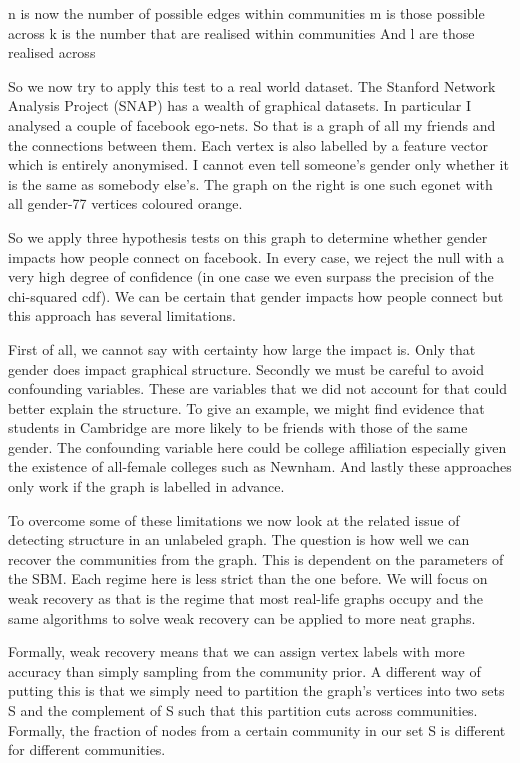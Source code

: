 \documentclass[]{article}
\begin{document}
n is now the number of possible edges within communities
m is those possible across
k is the number that are realised within communities
And l are those realised across

So we now try to apply this test to a real world dataset. The Stanford Network Analysis Project (SNAP) has a wealth of graphical datasets. In particular I analysed a couple of facebook ego-nets. So that is a graph of all my friends and the connections between them. Each vertex is also labelled by a feature vector which is entirely anonymised. I cannot even tell someone’s gender only whether it is the same as somebody else’s. The graph on the right is one such egonet with all gender-77 vertices coloured orange.

So we apply three hypothesis tests on this graph to determine whether gender impacts how people connect on facebook. In every case, we reject the null with a very high degree of confidence (in one case we even surpass the precision of the chi-squared cdf). We can be certain that gender impacts how people connect but this approach has several limitations.

First of all, we cannot say with certainty how large the impact is. Only that gender does impact graphical structure. Secondly we must be careful to avoid confounding variables. These are variables that we did not account for that could better explain the structure. To give an example, we might find evidence that students in Cambridge are more likely to be friends with those of the same gender. The confounding variable here could be college affiliation especially given the existence of all-female colleges such as Newnham. And lastly these approaches only work if the graph is labelled in advance.

To overcome some of these limitations we now look at the related issue of detecting structure in an unlabeled graph. The question is how well we can recover the communities from the graph. This is dependent on the parameters of the SBM. Each regime here is less strict than the one before. We will focus on weak recovery as that is the regime that most real-life graphs occupy and the same algorithms to solve weak recovery can be applied to more neat graphs.

Formally, weak recovery means that we can assign vertex labels with more accuracy than simply sampling from the community prior. A different way of putting this is that we simply need to partition the graph’s vertices into two sets S and the complement of S such that this partition cuts across communities. Formally, the fraction of nodes from a certain community in our set S is different for different communities.
\end{document}
